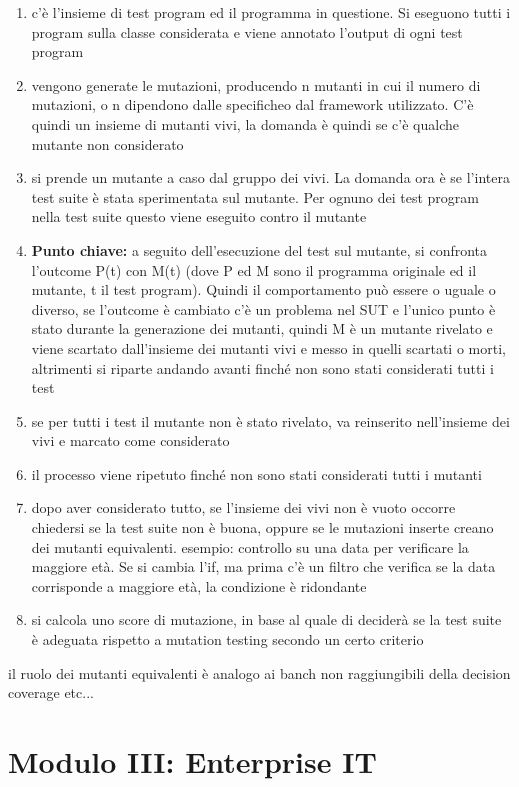 \documentclass{article}
\begin{document}
\begin{enumerate}
\item c'è l'insieme di test program ed il programma in questione. Si eseguono tutti i program sulla classe considerata e viene annotato l'output di ogni test program
\item vengono generate le mutazioni, producendo n mutanti in cui il numero di mutazioni, o n dipendono dalle specificheo dal framework utilizzato. C'è quindi un insieme di mutanti vivi, la domanda è quindi se c'è qualche mutante non considerato
\item si prende un mutante a caso dal gruppo dei vivi. La domanda ora è se l'intera test suite è stata sperimentata sul mutante. Per ognuno dei test program nella test suite questo viene eseguito contro il mutante
\item \textbf{Punto chiave:} a seguito dell'esecuzione del test sul mutante, si confronta l'outcome P(t) con M(t) (dove P ed M sono il programma originale ed il mutante, t il test program). Quindi il comportamento può essere o uguale o diverso, se l'outcome è cambiato c'è un problema nel SUT e l'unico punto è stato durante la generazione dei mutanti, quindi M è un mutante rivelato e viene scartato dall'insieme dei mutanti vivi e messo in quelli scartati o morti, altrimenti si riparte andando avanti finché non sono stati considerati tutti i test
\item se per tutti i test il mutante non è stato rivelato, va reinserito nell'insieme dei vivi e marcato come considerato
\item il processo viene ripetuto finché non sono stati considerati tutti i mutanti
\item dopo aver considerato tutto, se l'insieme dei vivi non è vuoto occorre chiedersi se la test suite non è buona, oppure se le mutazioni inserte creano dei mutanti equivalenti. esempio: controllo su una data per verificare la maggiore età. Se si cambia l'if, ma prima c'è un filtro che verifica se la data corrisponde a maggiore età, la condizione è ridondante
\item si calcola uno score di mutazione, in base al quale di deciderà se la test suite è adeguata rispetto a mutation testing secondo un certo criterio
\end{enumerate}
il ruolo dei mutanti equivalenti è analogo ai banch non raggiungibili della decision coverage etc...



\newpage
\section{Modulo III: Enterprise IT}
\end{document}
